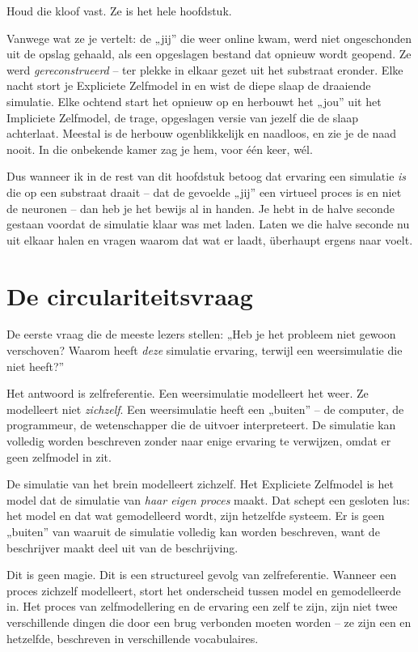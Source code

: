 \documentclass[11pt, twoside, openright]{book}
\begin{document}
Houd die kloof vast. Ze is het hele hoofdstuk.

Vanwege wat ze je vertelt: de „jij” die weer online kwam, werd niet ongeschonden uit de opslag gehaald, als een opgeslagen bestand dat opnieuw wordt geopend. Ze werd \textit{gereconstrueerd} -- ter plekke in elkaar gezet uit het substraat eronder. Elke nacht stort je Expliciete Zelfmodel in en wist de diepe slaap de draaiende simulatie. Elke ochtend start het opnieuw op en herbouwt het „jou” uit het Impliciete Zelfmodel, de trage, opgeslagen versie van jezelf die de slaap achterlaat. Meestal is de herbouw ogenblikkelijk en naadloos, en zie je de naad nooit. In die onbekende kamer zag je hem, voor één keer, wél.

Dus wanneer ik in de rest van dit hoofdstuk betoog dat ervaring een simulatie \textit{is} die op een substraat draait -- dat de gevoelde „jij” een virtueel proces is en niet de neuronen -- dan heb je het bewijs al in handen. Je hebt in de halve seconde gestaan voordat de simulatie klaar was met laden. Laten we die halve seconde nu uit elkaar halen en vragen waarom dat wat er laadt, überhaupt ergens naar voelt.

\section*{De circulariteitsvraag}

De eerste vraag die de meeste lezers stellen: „Heb je het probleem niet gewoon verschoven? Waarom heeft \textit{deze} simulatie ervaring, terwijl een weersimulatie die niet heeft?”

Het antwoord is zelfreferentie. Een weersimulatie modelleert het weer. Ze modelleert niet \textit{zichzelf}. Een weersimulatie heeft een „buiten” -- de computer, de programmeur, de wetenschapper die de uitvoer interpreteert. De simulatie kan volledig worden beschreven zonder naar enige ervaring te verwijzen, omdat er geen zelfmodel in zit.

De simulatie van het brein modelleert zichzelf. Het Expliciete Zelfmodel is het model dat de simulatie van \textit{haar eigen proces} maakt. Dat schept een gesloten lus: het model en dat wat gemodelleerd wordt, zijn hetzelfde systeem. Er is geen „buiten” van waaruit de simulatie volledig kan worden beschreven, want de beschrijver maakt deel uit van de beschrijving.

Dit is geen magie. Dit is een structureel gevolg van zelfreferentie. Wanneer een proces zichzelf modelleert, stort het onderscheid tussen model en gemodelleerde in. Het proces van zelfmodellering en de ervaring een zelf te zijn, zijn niet twee verschillende dingen die door een brug verbonden moeten worden -- ze zijn een en hetzelfde, beschreven in verschillende vocabulaires.
\end{document}
